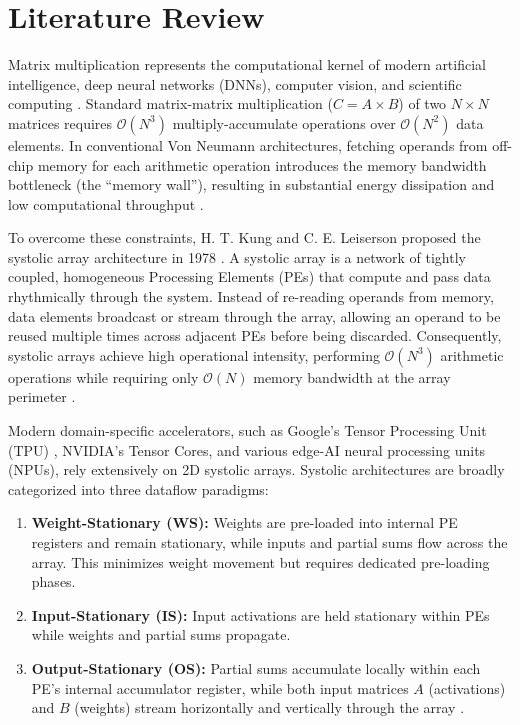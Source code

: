 \documentclass[conference]{IEEEtran}
\begin{document}
\section{Literature Review}
Matrix multiplication represents the computational kernel of modern artificial intelligence, deep neural networks (DNNs), computer vision, and scientific computing \cite{jouppi2017}. Standard matrix-matrix multiplication ($C = A \times B$) of two $N \times N$ matrices requires $\mathcal{O}(N^3)$ multiply-accumulate operations over $\mathcal{O}(N^2)$ data elements. In conventional Von Neumann architectures, fetching operands from off-chip memory for each arithmetic operation introduces the memory bandwidth bottleneck (the ``memory wall''), resulting in substantial energy dissipation and low computational throughput \cite{patterson2020}.

To overcome these constraints, H. T. Kung and C. E. Leiserson proposed the systolic array architecture in 1978 \cite{kung1978}. A systolic array is a network of tightly coupled, homogeneous Processing Elements (PEs) that compute and pass data rhythmically through the system. Instead of re-reading operands from memory, data elements broadcast or stream through the array, allowing an operand to be reused multiple times across adjacent PEs before being discarded. Consequently, systolic arrays achieve high operational intensity, performing $\mathcal{O}(N^3)$ arithmetic operations while requiring only $\mathcal{O}(N)$ memory bandwidth at the array perimeter \cite{kung1982}.

Modern domain-specific accelerators, such as Google's Tensor Processing Unit (TPU) \cite{jouppi2017}, NVIDIA's Tensor Cores, and various edge-AI neural processing units (NPUs), rely extensively on 2D systolic arrays. Systolic architectures are broadly categorized into three dataflow paradigms:
\begin{enumerate}
    \item \textbf{Weight-Stationary (WS):} Weights are pre-loaded into internal PE registers and remain stationary, while inputs and partial sums flow across the array. This minimizes weight movement but requires dedicated pre-loading phases.
    \item \textbf{Input-Stationary (IS):} Input activations are held stationary within PEs while weights and partial sums propagate.
    \item \textbf{Output-Stationary (OS):} Partial sums accumulate locally within each PE's internal accumulator register, while both input matrices $A$ (activations) and $B$ (weights) stream horizontally and vertically through the array \cite{chen2016}.
\end{enumerate}
\end{document}

